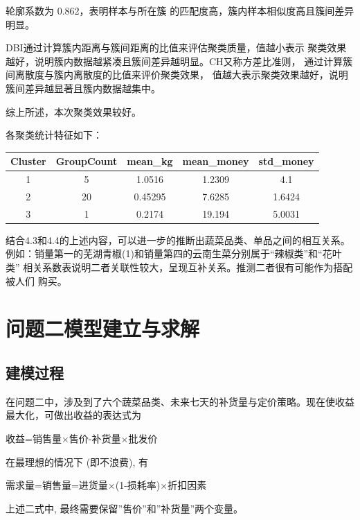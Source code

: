 \documentclass{cumcmthesis}
\begin{document}
轮廓系数为 0.862，表明样本与所在簇
的匹配度高，簇内样本相似度高且簇间差异明显。

DBI通过计算簇内距离与簇间距离的比值来评估聚类质量，值越小表示
聚类效果越好，说明簇内数据越紧凑且簇间差异越明显。CH又称方差比准则，
通过计算簇间离散度与簇内离散度的比值来评价聚类效果，
值越大表示聚类效果越好，说明簇间差异越显著且簇内数据越集中。

综上所述，本次聚类效果较好。

各聚类统计特征如下：

\begin{table}[H]
    \centering
    \begin{tabular}{c c c c c}
    \toprule
    Cluster & GroupCount & mean\_kg & mean\_money & std\_money \\
    \midrule
    1 & 5 & 1.0516 & 1.2309 & 4.1 \\
    2 & 20 & 0.45295 & 7.6285 & 1.6424 \\
    3 & 1 & 0.2174 & 19.194 & 5.0031 \\
    \bottomrule
    \end{tabular}
\end{table}

结合4.3和4.4的上述内容，可以进一步的推断出蔬菜品类、单品之间的相互关系。
例如：销量第一的芜湖青椒(1)和销量第四的云南生菜分别属于“辣椒类”和“花叶类”
相关系数表说明二者关联性较大，呈现互补关系。推测二者很有可能作为搭配被人们
购买。


\section{问题二模型建立与求解}%

\subsection{建模过程}
在问题二中，涉及到了六个蔬菜品类、未来七天的补货量与定价策略。现在使收益最大化，可做出收益的表达式为

\begin{center}     
收益=销售量$\times$售价-补货量$\times$批发价
\end{center}

在最理想的情况下 (即不浪费), 有

\begin{center}  
需求量=销售量=进货量$\times$(1-损耗率)$\times$折扣因素
\end{center}   

上述二式中, 最终需要保留''售价''和''补货量''两个变量。
\end{document}
